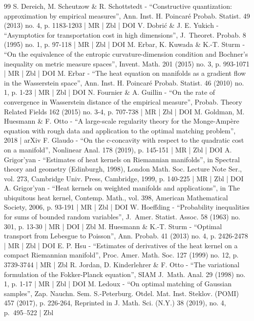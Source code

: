 \begin{thebibliography}{99}
S. Dereich, M. Scheutzow \& R. Schottstedt - “Constructive quantization: approximation by empirical measures”, Ann. Inst. H. Poincaré Probab. Statist. 49 (2013) no. 4, p. 1183-1203 | MR | Zbl | DOI
V. Dobrić \& J. E. Yukich - “Asymptotics for transportation cost in high dimensions”, J. Theoret. Probab. 8 (1995) no. 1, p. 97-118 | MR | Zbl | DOI
M. Erbar, K. Kuwada \& K.-T. Sturm - “On the equivalence of the entropic curvature-dimension condition and Bochner’s inequality on metric measure spaces”, Invent. Math. 201 (2015) no. 3, p. 993-1071 | MR | Zbl | DOI
M. Erbar - “The heat equation on manifolds as a gradient flow in the Wasserstein space”, Ann. Inst. H. Poincaré Probab. Statist. 46 (2010) no. 1, p. 1-23 | MR | Zbl | DOI
N. Fournier \& A. Guillin - “On the rate of convergence in Wasserstein distance of the empirical measure”, Probab. Theory Related Fields 162 (2015) no. 3-4, p. 707-738 | MR | Zbl | DOI
M. Goldman, M. Huesmann \& F. Otto - “A large-scale regularity theory for the Monge-Ampère equation with rough data and application to the optimal matching problem”, 2018 | arXiv
F. Glaudo - “On the c-concavity with respect to the quadratic cost on a manifold”, Nonlinear Anal. 178 (2019), p. 145-151 | MR | Zbl | DOI
A. Grigor’yan - “Estimates of heat kernels on Riemannian manifolds”, in Spectral theory and geometry (Edinburgh, 1998), London Math. Soc. Lecture Note Ser., vol. 273, Cambridge Univ. Press, Cambridge, 1999, p. 140-225 | MR | Zbl | DOI
A. Grigor’yan - “Heat kernels on weighted manifolds and applications”, in The ubiquitous heat kernel, Contemp. Math., vol. 398, American Mathematical Society, 2006, p. 93-191 | MR | Zbl | DOI
W. Hoeffding - “Probability inequalities for sums of bounded random variables”, J. Amer. Statist. Assoc. 58 (1963) no. 301, p. 13-30 | MR | DOI | Zbl
M. Huesmann \& K.-T. Sturm - “Optimal transport from Lebesgue to Poisson”, Ann. Probab. 41 (2013) no. 4, p. 2426-2478 | MR | Zbl | DOI
E. P. Hsu - “Estimates of derivatives of the heat kernel on a compact Riemannian manifold”, Proc. Amer. Math. Soc. 127 (1999) no. 12, p. 3739-3744 | MR | Zbl
R. Jordan, D. Kinderlehrer \& F. Otto - “The variational formulation of the Fokker-Planck equation”, SIAM J. Math. Anal. 29 (1998) no. 1, p. 1-17 | MR | Zbl | DOI
M. Ledoux - “On optimal matching of Gaussian samples”, Zap. Nauchn. Sem. S.-Peterburg. Otdel. Mat. Inst. Steklov. (POMI) 457 (2017), p. 226-264, Reprinted in J. Math. Sci. (N.Y.) 38 (2019), no. 4, p. 495–522 | Zbl

\end{thebibliography}
